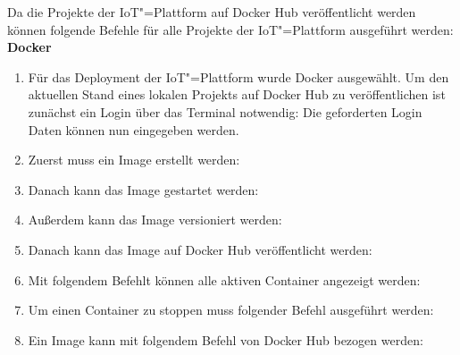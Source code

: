 Da die Projekte der IoT"=Plattform auf Docker Hub veröffentlicht werden können folgende Befehle für alle Projekte der IoT"=Plattform ausgeführt werden: \newline
\textbf{Docker} 
\begin{enumerate}
	\item Für das Deployment der IoT"=Plattform wurde Docker ausgewählt. Um den aktuellen Stand eines lokalen Projekts auf Docker Hub zu veröffentlichen ist zunächst ein Login über das Terminal notwendig: \newline
	Die geforderten Login Daten können nun eingegeben werden. 
	\item Zuerst muss ein Image erstellt werden: \newline
	\item Danach kann das Image gestartet werden: \newline
	\item Außerdem kann das Image versioniert werden: \newline
	\item Danach kann das Image auf Docker Hub veröffentlicht werden: \newline
	\item Mit folgendem Befehlt können alle aktiven Container angezeigt werden: \newline
	\item Um einen Container zu stoppen muss folgender Befehl ausgeführt werden: \newline
	\item Ein Image kann mit folgendem Befehl von Docker Hub bezogen werden: \newline
\end{enumerate}

